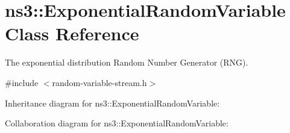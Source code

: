 \hypertarget{classns3_1_1ExponentialRandomVariable}{}\section{ns3\+:\+:Exponential\+Random\+Variable Class Reference}
\label{classns3_1_1ExponentialRandomVariable}


The exponential distribution Random Number Generator (R\+NG).  




{\ttfamily \#include $<$random-\/variable-\/stream.\+h$>$}



Inheritance diagram for ns3\+:\+:Exponential\+Random\+Variable\+:


Collaboration diagram for ns3\+:\+:Exponential\+Random\+Variable\+:
